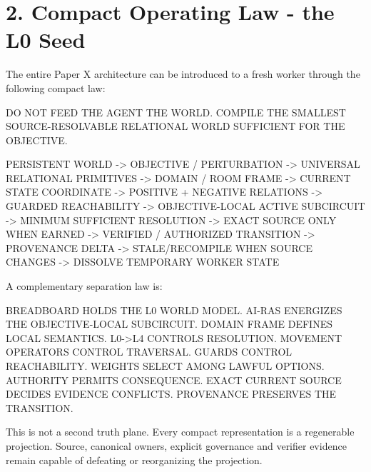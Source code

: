 \documentclass[
  10pt,
  letterpaper,
]{article}
\newenvironment{Shaded}{}{}
\newcommand{\NormalTok}[1]{#1}
\begin{document}
\section{2. Compact Operating Law - the L0
Seed}\label{2-compact-operating-law---the-l0-seed}

The entire Paper X architecture can be introduced to a fresh worker
through the following compact law:

\begin{Shaded}
\begin{Highlighting}[]
\NormalTok{DO NOT FEED THE AGENT THE WORLD.}
\NormalTok{COMPILE THE SMALLEST SOURCE{-}RESOLVABLE RELATIONAL WORLD SUFFICIENT FOR THE OBJECTIVE.}

\NormalTok{PERSISTENT WORLD}
\NormalTok{  {-}\textgreater{} OBJECTIVE / PERTURBATION}
\NormalTok{  {-}\textgreater{} UNIVERSAL RELATIONAL PRIMITIVES}
\NormalTok{  {-}\textgreater{} DOMAIN / ROOM FRAME}
\NormalTok{  {-}\textgreater{} CURRENT STATE COORDINATE}
\NormalTok{  {-}\textgreater{} POSITIVE + NEGATIVE RELATIONS}
\NormalTok{  {-}\textgreater{} GUARDED REACHABILITY}
\NormalTok{  {-}\textgreater{} OBJECTIVE{-}LOCAL ACTIVE SUBCIRCUIT}
\NormalTok{  {-}\textgreater{} MINIMUM SUFFICIENT RESOLUTION}
\NormalTok{  {-}\textgreater{} EXACT SOURCE ONLY WHEN EARNED}
\NormalTok{  {-}\textgreater{} VERIFIED / AUTHORIZED TRANSITION}
\NormalTok{  {-}\textgreater{} PROVENANCE DELTA}
\NormalTok{  {-}\textgreater{} STALE/RECOMPILE WHEN SOURCE CHANGES}
\NormalTok{  {-}\textgreater{} DISSOLVE TEMPORARY WORKER STATE}
\end{Highlighting}
\end{Shaded}

A complementary separation law is:

\begin{Shaded}
\begin{Highlighting}[]
\NormalTok{BREADBOARD HOLDS THE L0 WORLD MODEL.}
\NormalTok{AI{-}RAS ENERGIZES THE OBJECTIVE{-}LOCAL SUBCIRCUIT.}
\NormalTok{DOMAIN FRAME DEFINES LOCAL SEMANTICS.}
\NormalTok{L0{-}\textgreater{}L4 CONTROLS RESOLUTION.}
\NormalTok{MOVEMENT OPERATORS CONTROL TRAVERSAL.}
\NormalTok{GUARDS CONTROL REACHABILITY.}
\NormalTok{WEIGHTS SELECT AMONG LAWFUL OPTIONS.}
\NormalTok{AUTHORITY PERMITS CONSEQUENCE.}
\NormalTok{EXACT CURRENT SOURCE DECIDES EVIDENCE CONFLICTS.}
\NormalTok{PROVENANCE PRESERVES THE TRANSITION.}
\end{Highlighting}
\end{Shaded}

This is not a second truth plane. Every compact representation is a
regenerable projection. Source, canonical owners, explicit governance
and verifier evidence remain capable of defeating or reorganizing the
projection.
\end{document}
